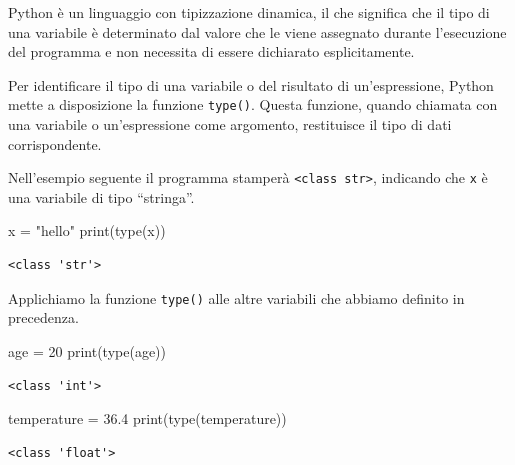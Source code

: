 \documentclass[
  letterpaper,
  krantz2]{{[}./krantz{]}}
\newenvironment{Shaded}{\begin{snugshade}}{\end{snugshade}}
\newcommand{\BuiltInTok}[1]{\textcolor[rgb]{0.00,0.23,0.31}{#1}}
\newcommand{\DecValTok}[1]{\textcolor[rgb]{0.68,0.00,0.00}{#1}}
\newcommand{\FloatTok}[1]{\textcolor[rgb]{0.68,0.00,0.00}{#1}}
\newcommand{\NormalTok}[1]{\textcolor[rgb]{0.00,0.23,0.31}{#1}}
\newcommand{\OperatorTok}[1]{\textcolor[rgb]{0.37,0.37,0.37}{#1}}
\newcommand{\StringTok}[1]{\textcolor[rgb]{0.13,0.47,0.30}{#1}}
\begin{document}
Python è un linguaggio con tipizzazione dinamica, il che significa che
il tipo di una variabile è determinato dal valore che le viene assegnato
durante l'esecuzione del programma e non necessita di essere dichiarato
esplicitamente.

Per identificare il tipo di una variabile o del risultato di
un'espressione, Python mette a disposizione la funzione \texttt{type()}.
Questa funzione, quando chiamata con una variabile o un'espressione come
argomento, restituisce il tipo di dati corrispondente.

Nell'esempio seguente il programma stamperà
\texttt{\textless{}class\ \textquotesingle{}str\textquotesingle{}\textgreater{}},
indicando che \texttt{x} è una variabile di tipo ``stringa''.

\begin{Shaded}
\begin{Highlighting}[]
\NormalTok{x }\OperatorTok{=} \StringTok{"hello"}
\BuiltInTok{print}\NormalTok{(}\BuiltInTok{type}\NormalTok{(x))}
\end{Highlighting}
\end{Shaded}

\begin{verbatim}
<class 'str'>
\end{verbatim}

Applichiamo la funzione \texttt{type()} alle altre variabili che abbiamo
definito in precedenza.

\begin{Shaded}
\begin{Highlighting}[]
\NormalTok{age }\OperatorTok{=} \DecValTok{20}
\BuiltInTok{print}\NormalTok{(}\BuiltInTok{type}\NormalTok{(age))}
\end{Highlighting}
\end{Shaded}

\begin{verbatim}
<class 'int'>
\end{verbatim}

\begin{Shaded}
\begin{Highlighting}[]
\NormalTok{temperature }\OperatorTok{=} \FloatTok{36.4}
\BuiltInTok{print}\NormalTok{(}\BuiltInTok{type}\NormalTok{(temperature))}
\end{Highlighting}
\end{Shaded}

\begin{verbatim}
<class 'float'>
\end{verbatim}
\end{document}
